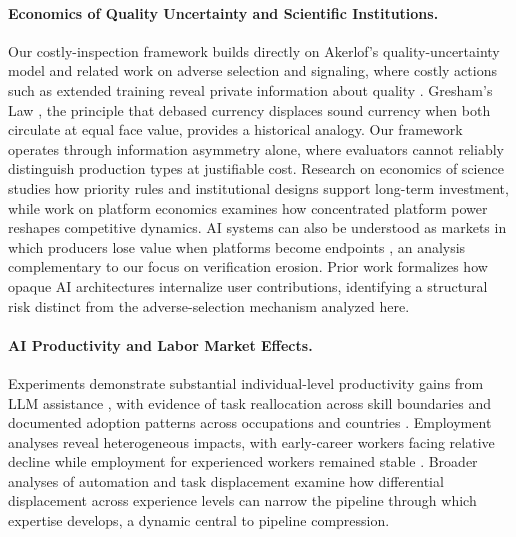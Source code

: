\documentclass{article}
\theoremstyle{plain}
\theoremstyle{definition}
\theoremstyle{remark}
\begin{document}
\paragraph{Economics of Quality Uncertainty and Scientific Institutions.}
Our costly-inspection framework builds directly on Akerlof's quality-uncertainty model \citep{akerlof1970lemons} and related work on adverse selection \citep{rothschild-stiglitz-1976-equilibrium} and signaling, where costly actions such as extended training reveal private information about quality \citep{spence1973signaling}. Gresham's Law \citep{mundell1998uses, rolnick1986gresham}, the principle that debased currency displaces sound currency when both circulate at equal face value, provides a historical analogy. Our framework operates through information asymmetry alone, where evaluators cannot reliably distinguish production types at justifiable cost. Research on economics of science \citep{PARTHA1994487} studies how priority rules and institutional designs support long-term investment, while work on platform economics \citep{vipra2023marketconcentrationimplicationsfoundation} examines how concentrated platform power reshapes competitive dynamics. AI systems can also be understood as markets in which producers lose value when platforms become endpoints \citep{jordan2025collectivisteconomicperspectiveai}, an analysis complementary to our focus on verification erosion. Prior work \citep{cao2025blackboxabsorptionllms} formalizes how opaque AI architectures internalize user contributions, identifying a structural risk distinct from the adverse-selection mechanism analyzed here.

\paragraph{AI Productivity and Labor Market Effects.}
Experiments demonstrate substantial individual-level productivity gains from LLM assistance \citep{doi:10.1126/science.adh2586, 10.1093/qje/qjae044}, with evidence of task reallocation across skill boundaries \citep{DellAcqua2023NavigatingTJ} and documented adoption patterns across occupations and countries \citep{doi:10.1126/science.adj0998, Chatterji2025How}. Employment analyses reveal heterogeneous impacts, with early-career workers facing relative decline while employment for experienced workers remained stable \citep{brynjolfsson2025canaries, signalfire2025talent}. Broader analyses of automation and task displacement \citep{10.1257/jep.33.2.3, hazra2025position} examine how differential displacement across experience levels can narrow the pipeline through which expertise develops, a dynamic central to pipeline compression.
\end{document}
